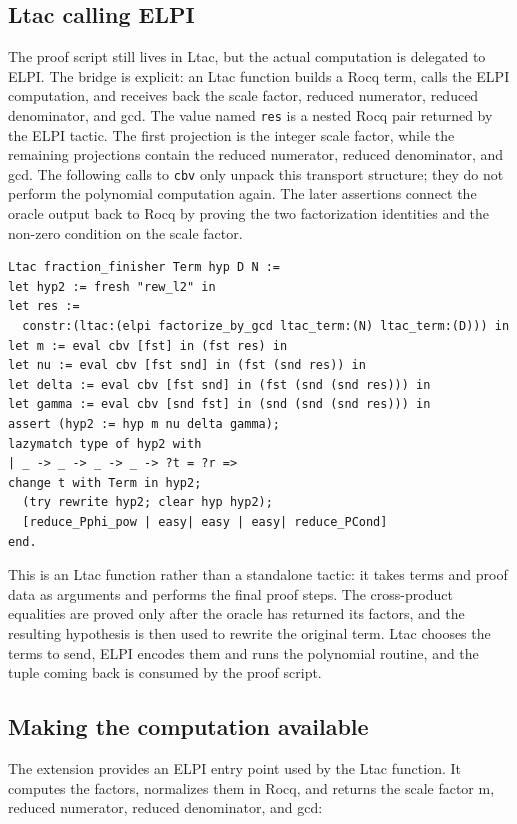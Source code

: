 \documentclass[11pt]{article}
\begin{document}
\subsection{Ltac calling ELPI}
The proof script still lives in Ltac, but the actual computation is delegated to
ELPI. The bridge is explicit: an Ltac function builds a Rocq term, calls the
ELPI computation, and receives back the scale factor, reduced numerator, reduced denominator, and gcd.
The value named \texttt{res} is a nested Rocq pair returned by the ELPI tactic.
The first projection is the integer scale factor, while the remaining
projections contain the reduced numerator, reduced denominator, and gcd. The
following calls to \texttt{cbv} only unpack this transport structure; they do
not perform the polynomial computation again. The later assertions connect the
oracle output back to Rocq by proving the two factorization identities and the
non-zero condition on the scale factor.
\begin{lstlisting}
Ltac fraction_finisher Term hyp D N :=
let hyp2 := fresh "rew_l2" in
let res :=
  constr:(ltac:(elpi factorize_by_gcd ltac_term:(N) ltac_term:(D))) in
let m := eval cbv [fst] in (fst res) in
let nu := eval cbv [fst snd] in (fst (snd res)) in
let delta := eval cbv [fst snd] in (fst (snd (snd res))) in
let gamma := eval cbv [snd fst] in (snd (snd (snd res))) in
assert (hyp2 := hyp m nu delta gamma);
lazymatch type of hyp2 with
| _ -> _ -> _ -> _ -> ?t = ?r =>
change t with Term in hyp2;
  (try rewrite hyp2; clear hyp hyp2);
  [reduce_Pphi_pow | easy| easy | easy| reduce_PCond]
end.
\end{lstlisting}
This is an Ltac function rather than a standalone tactic: it takes terms and
proof data as arguments and performs the final proof steps. The cross-product
equalities are proved only after the oracle has returned its factors, and the
resulting hypothesis is then used to rewrite the original term. Ltac chooses the
terms to send, ELPI encodes them and runs the polynomial routine, and the tuple
coming back is consumed by the proof script.


\subsection{Making the computation available}
The extension provides an ELPI entry point used by the Ltac function. It computes
the factors, normalizes them in Rocq, and returns the scale factor m,
reduced numerator, reduced denominator, and gcd:
\end{document}
